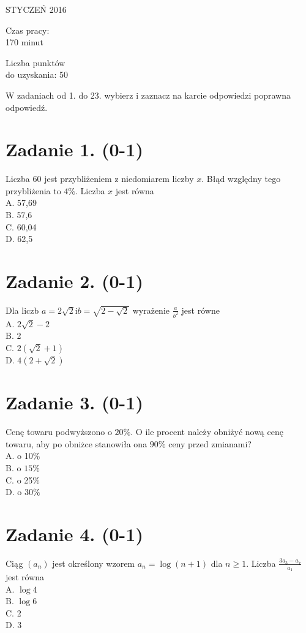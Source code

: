 \documentclass[10pt]{article}
\begin{document}
STYCZEŃ 2016

Czas pracy:\\
170 minut

Liczba punktów\\
do uzyskania: 50

W zadaniach od 1. do 23. wybierz i zaznacz na karcie odpowiedzi poprawna odpowiedź.

\section*{Zadanie 1. (0-1)}
Liczba 60 jest przybliżeniem z niedomiarem liczby \(x\). Błąd względny tego przybliżenia to \(4 \%\). Liczba \(x\) jest równa\\
A. 57,69\\
B. 57,6\\
C. 60,04\\
D. 62,5

\section*{Zadanie 2. (0-1)}
Dla liczb \(a=2 \sqrt{2} \mathrm{i} b=\sqrt{2-\sqrt{2}}\) wyrażenie \(\frac{a}{b^{2}}\) jest równe\\
A. \(2 \sqrt{2}-2\)\\
B. 2\\
C. \(2(\sqrt{2}+1)\)\\
D. \(4(2+\sqrt{2})\)

\section*{Zadanie 3. (0-1)}
Cenę towaru podwyższono o \(20 \%\). O ile procent należy obniżyć nową cenę towaru, aby po obniżce stanowiła ona \(90 \%\) ceny przed zmianami?\\
A. o 10\%\\
B. o \(15 \%\)\\
C. o 25\%\\
D. o \(30 \%\)

\section*{Zadanie 4. (0-1)}
Ciąg \(\left(a_{n}\right)\) jest określony wzorem \(a_{n}=\log (n+1)\) dla \(n \geqslant 1\). Liczba \(\frac{3 a_{3}-a_{7}}{a_{1}}\) jest równa\\
A. \(\log 4\)\\
B. \(\log 6\)\\
C. 2\\
D. 3
\end{document}
